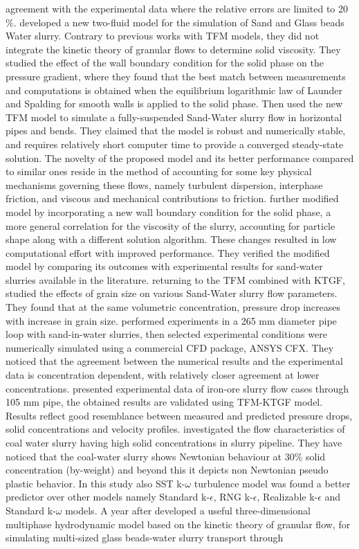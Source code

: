 \documentclass[review,3p,times,12pt]{elsarticle}
\begin{document}
agreement with the experimental data where the relative errors are limited to 20$\%$. \citet{Messa-2013} developed a new two-fluid model for the simulation of Sand and Glass beads Water slurry. Contrary to previous works with TFM models, they did not integrate the kinetic theory of granular flows to determine solid viscosity. They studied the effect of the wall boundary condition for the solid phase on the pressure gradient, where they found that the best match between measurements and computations is obtained when the equilibrium logarithmic law of Launder and Spalding for smooth walls is applied to the solid phase. Then \citet{Messa-2014} used the new TFM model to  simulate a fully-suspended Sand-Water slurry flow in horizontal pipes and bends. They claimed that the model is robust and numerically stable, and requires relatively short computer time to provide a converged steady-state solution. The novelty of the proposed model and its better performance compared to similar ones reside in the method of accounting for some key physical mechanisms governing these flows, namely turbulent dispersion, interphase friction, and viscous and mechanical contributions to friction. \citet{Messa-2015} further modified \citet{Messa-2014} model by incorporating a new wall boundary condition for the solid phase, a more general correlation for the viscosity of the slurry, accounting for particle shape along with a different solution algorithm. These changes resulted in low computational effort with improved performance. They verified the modified model by comparing its outcomes with experimental results for sand-water slurries available in the literature. returning to the TFM combined with KTGF, \citet{Gopaliya-2014} studied the effects of grain size on various Sand-Water slurry flow parameters. They found that at the same  volumetric concentration, pressure drop increases with increase in grain size. \citet{Hashemi-2016} performed experiments in a 265 mm diameter pipe loop with sand-in-water slurries, then selected experimental conditions were  numerically simulated using a commercial CFD package, ANSYS CFX. They noticed that the agreement between the numerical results and the experimental data is  concentration dependent, with relatively closer agreement at lower concentrations. \citet{kumar2019experimental} presented experimental data of iron-ore slurry flow cases through 105 mm pipe, the obtained results are validated using TFM-KTGF model. Results reflect good resemblance between measured and predicted pressure drops, solid concentrations and velocity profiles. \citet{singh2020computational} investigated the flow characteristics of coal water slurry having high solid concentrations in slurry pipeline. They have noticed that the coal-water slurry shows Newtonian behaviour at 30$\%$ solid concentration (by-weight) and beyond this it depicts non Newtonian pseudo plastic behavior. In this study also  SST k-$\omega$ turbulence model was found a better predictor over other models namely Standard k-$\epsilon$, RNG k-$\epsilon$, Realizable k-$\epsilon$ and Standard k-$\omega$ models. A year after \citet{Li-2018a} developed a useful three-dimensional multiphase hydrodynamic model based on the kinetic theory of granular flow, for simulating multi-sized glass beads-water slurry transport through 
\end{document}
